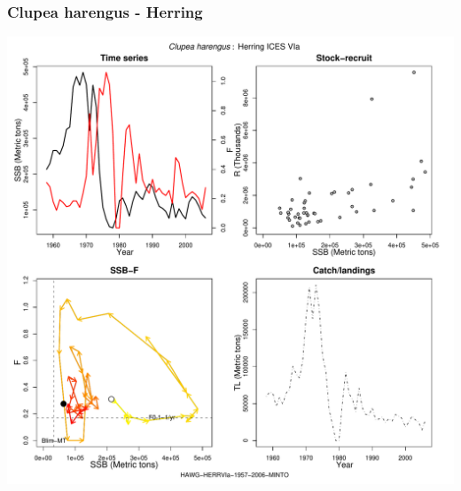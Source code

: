 \subsubsection{Clupea harengus - Herring}
\begin{center}
\includegraphics[width=1.2\textwidth]{../R/figures/HAWG-HERRVIa-1957-2006-MINTO.pdf}
\end{center}


